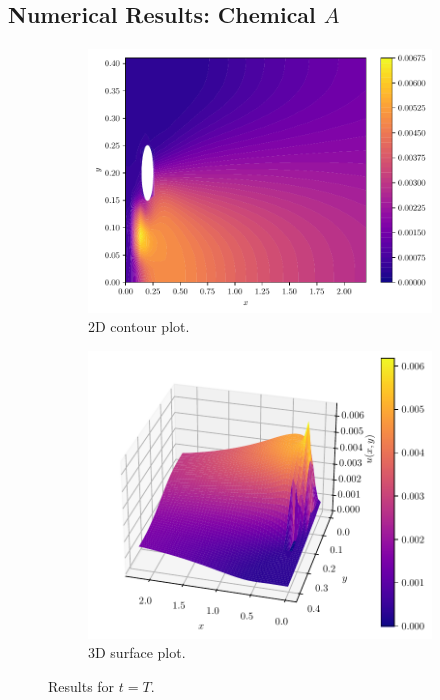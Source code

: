 \documentclass{beamer}
\theoremstyle{definition}
\theoremstyle{remark}
\theoremstyle{example}
\newif\ifinsection
\newif\ifinsubsection
\let\oldsubsection\subsection
\renewcommand{\subsection}{
  \global\insubsectiontrue
  \oldsubsection}
\newcommand {\aframe}[1] {
  \begin{frame}
    \ifinsection\frametitle{\secname}\fi
    \ifinsubsection\framesubtitle{\subsecname}\fi
  #1
  \end{frame}
}
\begin{document}
\subsection{Numerical Results: Chemical $A$}
\aframe{
  \begin{figure}
    \begin{subfigure}[b]{0.45\textwidth}
      \centering \includegraphics[width=\textwidth]{figs/a-chemical-2d.pdf}
      \caption{2D contour plot.}
    \end{subfigure}
    \begin{subfigure}[b]{0.53\textwidth}
      \centering \includegraphics[width=\textwidth]{figs/a-chemical-3d.pdf}
      \caption{3D surface plot.}
    \end{subfigure}
    \caption{Results for $t=T$.}
  \end{figure}
}
\end{document}
